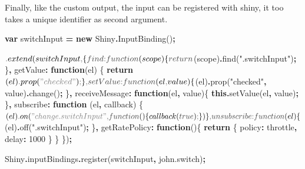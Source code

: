 \documentclass[
]{krantz}
\makeatletter
\newenvironment{Shaded}{\begin{snugshade}}{\end{snugshade}}
\newcommand{\AttributeTok}[1]{\textcolor[rgb]{0.61,0.61,0.61}{#1}}
\newcommand{\ControlFlowTok}[1]{\textcolor[rgb]{0.27,0.27,0.27}{\textbf{#1}}}
\newcommand{\DataTypeTok}[1]{\textcolor[rgb]{0.27,0.27,0.27}{#1}}
\newcommand{\DecValTok}[1]{\textcolor[rgb]{0.06,0.06,0.06}{#1}}
\newcommand{\FunctionTok}[1]{\textcolor[rgb]{0,0,0}{#1}}
\newcommand{\KeywordTok}[1]{\textcolor[rgb]{0.27,0.27,0.27}{\textbf{#1}}}
\newcommand{\NormalTok}[1]{#1}
\newcommand{\OperatorTok}[1]{\textcolor[rgb]{0.43,0.43,0.43}{\textbf{#1}}}
\newcommand{\StringTok}[1]{\textcolor[rgb]{0.5,0.5,0.5}{#1}}
\newenvironment{kframe}{%
\medskip{}
\setlength{\fboxsep}{.8em}
 \def\at@end@of@kframe{}%
 \ifinner\ifhmode%
  \def\at@end@of@kframe{\end{minipage}}%
  \begin{minipage}{\columnwidth}%
 \fi\fi%
 \def\FrameCommand##1{\hskip\@totalleftmargin \hskip-\fboxsep
 \colorbox{shadecolor}{##1}\hskip-\fboxsep
     \hskip-\linewidth \hskip-\@totalleftmargin \hskip\columnwidth}%
 \MakeFramed {\advance\hsize-\width
   \@totalleftmargin\z@ \linewidth\hsize
   \@setminipage}}%
 {\par\unskip\endMakeFramed%
 \at@end@of@kframe}
\renewenvironment{Shaded}{\begin{kframe}}{\end{kframe}}
\makeatother
\begin{document}
Finally, like the custom output, the input can be registered with shiny, it too takes a unique identifier as second argument.

\begin{Shaded}
\begin{Highlighting}[]
\KeywordTok{var}\NormalTok{ switchInput }\OperatorTok{=} \KeywordTok{new}\NormalTok{ Shiny}\OperatorTok{.}\FunctionTok{InputBinding}\NormalTok{()}\OperatorTok{;}

\NormalTok{$}\OperatorTok{.}\FunctionTok{extend}\NormalTok{(switchInput}\OperatorTok{,}\NormalTok{ \{}
  \DataTypeTok{find}\OperatorTok{:} \KeywordTok{function}\NormalTok{(scope) \{}
    \ControlFlowTok{return}\NormalTok{ $(scope)}\OperatorTok{.}\FunctionTok{find}\NormalTok{(}\StringTok{".switchInput"}\NormalTok{)}\OperatorTok{;}
\NormalTok{  \}}\OperatorTok{,}
  \DataTypeTok{getValue}\OperatorTok{:} \KeywordTok{function}\NormalTok{(el) \{}
    \ControlFlowTok{return}\NormalTok{ $(el)}\OperatorTok{.}\FunctionTok{prop}\NormalTok{(}\StringTok{"checked"}\NormalTok{)}\OperatorTok{;}
\NormalTok{  \}}\OperatorTok{,}
  \DataTypeTok{setValue}\OperatorTok{:} \KeywordTok{function}\NormalTok{(el}\OperatorTok{,}\NormalTok{ value) \{}
\NormalTok{    $(el)}\OperatorTok{.}\FunctionTok{prop}\NormalTok{(}\StringTok{"checked"}\OperatorTok{,}\NormalTok{ value)}\OperatorTok{.}\FunctionTok{change}\NormalTok{()}\OperatorTok{;}
\NormalTok{  \}}\OperatorTok{,}
  \DataTypeTok{receiveMessage}\OperatorTok{:} \KeywordTok{function}\NormalTok{(el}\OperatorTok{,}\NormalTok{ value)\{}
    \KeywordTok{this}\OperatorTok{.}\FunctionTok{setValue}\NormalTok{(el}\OperatorTok{,}\NormalTok{ value)}\OperatorTok{;}
\NormalTok{  \}}\OperatorTok{,}
  \DataTypeTok{subscribe}\OperatorTok{:} \KeywordTok{function}\NormalTok{ (el}\OperatorTok{,}\NormalTok{ callback) \{}
\NormalTok{    $(el)}\OperatorTok{.}\FunctionTok{on}\NormalTok{(}\StringTok{"change.switchInput"}\OperatorTok{,} \KeywordTok{function}\NormalTok{()\{}
\NormalTok{      callback(}\KeywordTok{true}\NormalTok{)}\OperatorTok{;}
\NormalTok{    \})}
\NormalTok{  \}}\OperatorTok{,}
  \DataTypeTok{unsubscribe}\OperatorTok{:} \KeywordTok{function}\NormalTok{(el) \{}
\NormalTok{    $(el)}\OperatorTok{.}\FunctionTok{off}\NormalTok{(}\StringTok{".switchInput"}\NormalTok{)}\OperatorTok{;}
\NormalTok{  \}}\OperatorTok{,}
  \DataTypeTok{getRatePolicy}\OperatorTok{:} \KeywordTok{function}\NormalTok{()\{}
    \ControlFlowTok{return}\NormalTok{ \{}
      \DataTypeTok{policy}\OperatorTok{:} \StringTok{\textquotesingle{}throttle\textquotesingle{}}\OperatorTok{,}
      \DataTypeTok{delay}\OperatorTok{:} \DecValTok{1000}
\NormalTok{    \}}
\NormalTok{  \}}
\NormalTok{\})}\OperatorTok{;}

\NormalTok{Shiny}\OperatorTok{.}\AttributeTok{inputBindings}\OperatorTok{.}\FunctionTok{register}\NormalTok{(switchInput}\OperatorTok{,} \StringTok{\textquotesingle{}john.switch\textquotesingle{}}\NormalTok{)}\OperatorTok{;}
\end{Highlighting}
\end{Shaded}
\end{document}
